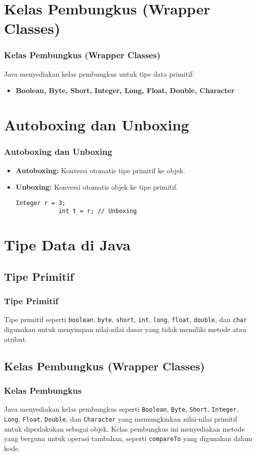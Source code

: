 \documentclass[aspectratio=169, table]{beamer}
\begin{document}
\section{Kelas Pembungkus (Wrapper Classes)}
\begin{frame}[fragile]
	\frametitle{Kelas Pembungkus (Wrapper Classes)}
	Java menyediakan kelas pembungkus untuk tipe data primitif:
	\begin{itemize}
		\item \textbf{Boolean, Byte, Short, Integer, Long, Float, Double, Character}
	\end{itemize}
\end{frame}

\section{Autoboxing dan Unboxing}
\begin{frame}[fragile]
	\frametitle{Autoboxing dan Unboxing}
	\begin{itemize}
		\item \textbf{Autoboxing:} Konversi otomatis tipe primitif ke objek.
		\item \textbf{Unboxing:} Konversi otomatis objek ke tipe primitif.
		\begin{lstlisting}[style=JavaStyle]
			Integer r = 3;
			int t = r; // Unboxing
		\end{lstlisting}
	\end{itemize}
\end{frame}

\section{Tipe Data di Java}

\subsection{Tipe Primitif}
\begin{frame}[fragile]
	\frametitle{Tipe Primitif}
	Tipe primitif seperti \texttt{boolean}, \texttt{byte}, \texttt{short}, \texttt{int}, \texttt{long}, \texttt{float}, \texttt{double}, dan \texttt{char} digunakan untuk menyimpan nilai-nilai dasar yang tidak memiliki metode atau atribut.
\end{frame}

\subsection{Kelas Pembungkus (Wrapper Classes)}
\begin{frame}[fragile]
	\frametitle{Kelas Pembungkus}
	Java menyediakan kelas pembungkus seperti \texttt{Boolean}, \texttt{Byte}, \texttt{Short}, \texttt{Integer}, \texttt{Long}, \texttt{Float}, \texttt{Double}, dan \texttt{Character} yang memungkinkan nilai-nilai primitif untuk diperlakukan sebagai objek. Kelas pembungkus ini menyediakan metode yang berguna untuk operasi tambahan, seperti \texttt{compareTo} yang digunakan dalam kode.
\end{frame}
\end{document}
